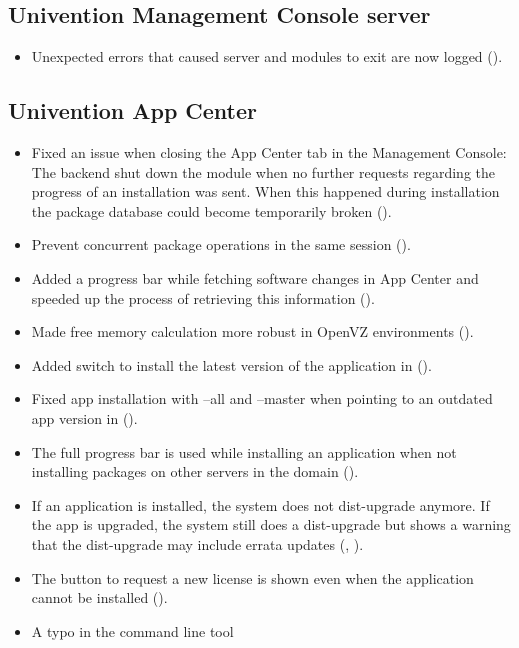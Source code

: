\subsection{Univention Management Console server}
\begin{itemize}
\item Unexpected errors that caused  server and modules to exit are now logged ().
\end{itemize}

\subsection{Univention App Center}
\begin{itemize}
\item Fixed an issue when closing the App Center tab in the Management Console:
  The backend shut down the module when no further requests regarding the
  progress of an installation was sent. When this happened during installation
  the package database could become temporarily broken ().
\item Prevent concurrent package operations in the same session
  ().
\item Added a progress bar while fetching software changes in App Center and
  speeded up the process of retrieving this information ().
\item Made free memory calculation more robust in OpenVZ environments
  ().
\item Added switch to install the latest version of the application in
   ().
\item Fixed app installation with --all and --master when pointing to an
  outdated app version in  ().
\item The full progress bar is used while installing an application when not
  installing packages on other servers in the domain ().
\item If an application is installed, the system does not dist-upgrade anymore.
  If the app is upgraded, the system still does a dist-upgrade but shows a
  warning that the dist-upgrade may include errata updates (,
  ).
\item The button to request a new license is shown even when the application
  cannot be installed ().
\item A typo in the command line tool

\end{itemize}
